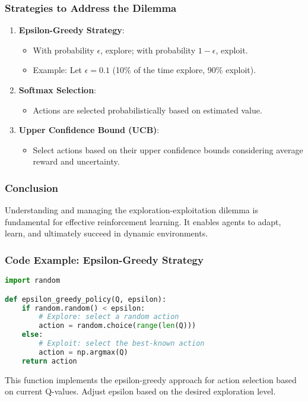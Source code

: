 \documentclass[aspectratio=169]{beamer}
\begin{document}
\begin{frame}[fragile]
    \frametitle{Strategies to Address the Dilemma}
    \begin{enumerate}
        \item \textbf{Epsilon-Greedy Strategy}:
            \begin{itemize}
                \item With probability $\epsilon$, explore; with probability $1-\epsilon$, exploit.
                \item Example: Let $\epsilon = 0.1$ (10\% of the time explore, 90\% exploit).
            \end{itemize}
        
        \item \textbf{Softmax Selection}: 
            \begin{itemize}
                \item Actions are selected probabilistically based on estimated value.
            \end{itemize}
        
        \item \textbf{Upper Confidence Bound (UCB)}: 
            \begin{itemize}
                \item Select actions based on their upper confidence bounds considering average reward and uncertainty.
            \end{itemize}
    \end{enumerate}
\end{frame}

\begin{frame}[fragile]
    \frametitle{Conclusion}
    Understanding and managing the exploration-exploitation dilemma is fundamental for effective reinforcement learning. 
    It enables agents to adapt, learn, and ultimately succeed in dynamic environments.
\end{frame}

\begin{frame}[fragile]
    \frametitle{Code Example: Epsilon-Greedy Strategy}
    \begin{lstlisting}[language=Python]
import random

def epsilon_greedy_policy(Q, epsilon):
    if random.random() < epsilon:
        # Explore: select a random action
        action = random.choice(range(len(Q)))
    else:
        # Exploit: select the best-known action
        action = np.argmax(Q)
    return action
    \end{lstlisting}
    This function implements the epsilon-greedy approach for action selection based on current Q-values. Adjust epsilon based on the desired exploration level.
\end{frame}
\end{document}
